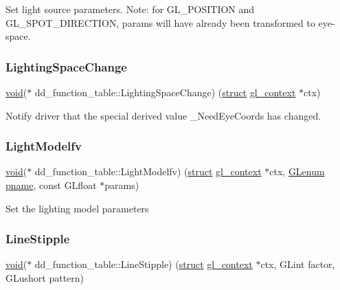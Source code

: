 Set light source parameters. Note\+: for G\+L\+\_\+\+P\+O\+S\+I\+T\+I\+ON and G\+L\+\_\+\+S\+P\+O\+T\+\_\+\+D\+I\+R\+E\+C\+T\+I\+ON, params will have already been transformed to eye-\/space. \mbox{\label{structdd__function__table_aac5505917d73e62a3a365ced64981083}} 
\subsubsection{\texorpdfstring{Lighting\+Space\+Change}{LightingSpaceChange}}
{\footnotesize\ttfamily \hyperlink{interfacevoid}{void}($\ast$ dd\+\_\+function\+\_\+table\+::\+Lighting\+Space\+Change) (\hyperlink{interfacestruct}{struct} \hyperlink{structgl__context}{gl\+\_\+context} $\ast$ctx)}

Notify driver that the special derived value \+\_\+\+Need\+Eye\+Coords has changed. \mbox{\label{structdd__function__table_a1b835dd88a3a64aeb91f3bb8d318874a}} 
\subsubsection{\texorpdfstring{Light\+Modelfv}{LightModelfv}}
{\footnotesize\ttfamily \hyperlink{interfacevoid}{void}($\ast$ dd\+\_\+function\+\_\+table\+::\+Light\+Modelfv) (\hyperlink{interfacestruct}{struct} \hyperlink{structgl__context}{gl\+\_\+context} $\ast$ctx, \hyperlink{interfacevoid}{G\+Lenum} \hyperlink{interfacevoid}{pname}, const G\+Lfloat $\ast$params)}

Set the lighting model parameters \mbox{\label{structdd__function__table_ac12a98543e785ceb983f4d38e8d9a089}} 
\subsubsection{\texorpdfstring{Line\+Stipple}{LineStipple}}
{\footnotesize\ttfamily \hyperlink{interfacevoid}{void}($\ast$ dd\+\_\+function\+\_\+table\+::\+Line\+Stipple) (\hyperlink{interfacestruct}{struct} \hyperlink{structgl__context}{gl\+\_\+context} $\ast$ctx, G\+Lint factor, G\+Lushort pattern)}

